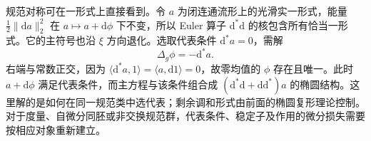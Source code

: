 \ProseParagraphBreak

规范对称可在一形式上直接看到。令 \(a\) 为闭连通流形上的光滑实一形式，能量 \(\tfrac12\|\mathrm da\|_2^2\) 在 \(a\mapsto a+\mathrm d\phi\) 下不变，所以 Euler 算子 \(\mathrm d^*\mathrm d\) 的核包含所有恰当一形式。它的主符号也沿 \(\xi\) 方向退化。选取代表条件 \(\mathrm d^*a=0\)，需解
\[
	\Delta_g\phi=-\mathrm d^*a.
\]
右端与常数正交，因为 \(\langle\mathrm d^*a,1\rangle=\langle a,\mathrm d1\rangle=0\)，故零均值的 \(\phi\) 存在且唯一。此时 \(a+\mathrm d\phi\) 满足代表条件，而主方程与该条件组合成 \((\mathrm d^*\mathrm d+\mathrm d\mathrm d^*)a\) 的椭圆结构。这里解的是如何在同一规范类中选代表；剩余调和形式由前面的椭圆复形理论控制。对于度量、自微分同胚或非交换规范群，代表条件、稳定子及作用的微分损失需要按相应对象重新建立。
